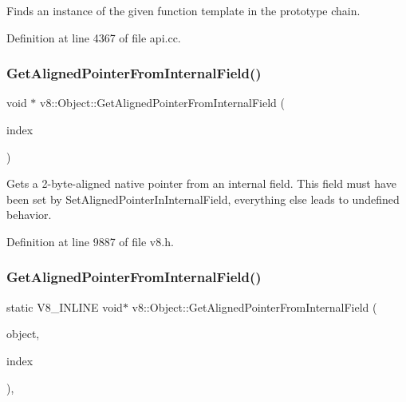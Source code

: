 Finds an instance of the given function template in the prototype chain. 

Definition at line 4367 of file api.\+cc.

\mbox{\label{classv8_1_1Object_a435f68bb7ef0f64dd522c5c910682448}} 
\subsubsection{\texorpdfstring{Get\+Aligned\+Pointer\+From\+Internal\+Field()}{GetAlignedPointerFromInternalField()}\hspace{0.1cm}{\footnotesize\ttfamily [1/2]}}
{\footnotesize\ttfamily void $\ast$ v8\+::\+Object\+::\+Get\+Aligned\+Pointer\+From\+Internal\+Field (\begin{DoxyParamCaption}\item[{\mbox{\hyperlink{classint}{int}}}]{index }\end{DoxyParamCaption})}

Gets a 2-\/byte-\/aligned native pointer from an internal field. This field must have been set by Set\+Aligned\+Pointer\+In\+Internal\+Field, everything else leads to undefined behavior. 

Definition at line 9887 of file v8.\+h.

\mbox{\label{classv8_1_1Object_a65b5a3dc93c0774594f8b0f2ab5481c8}} 
\subsubsection{\texorpdfstring{Get\+Aligned\+Pointer\+From\+Internal\+Field()}{GetAlignedPointerFromInternalField()}\hspace{0.1cm}{\footnotesize\ttfamily [2/2]}}
{\footnotesize\ttfamily static V8\+\_\+\+I\+N\+L\+I\+NE void$\ast$ v8\+::\+Object\+::\+Get\+Aligned\+Pointer\+From\+Internal\+Field (\begin{DoxyParamCaption}\item[{const \mbox{\hyperlink{classv8_1_1PersistentBase}{Persistent\+Base}}$<$ \mbox{\hyperlink{classv8_1_1Object}{Object}} $>$ \&}]{object,  }\item[{\mbox{\hyperlink{classint}{int}}}]{index }\end{DoxyParamCaption})\hspace{0.3cm}{\ttfamily [inline]}, {\ttfamily [static]}}

